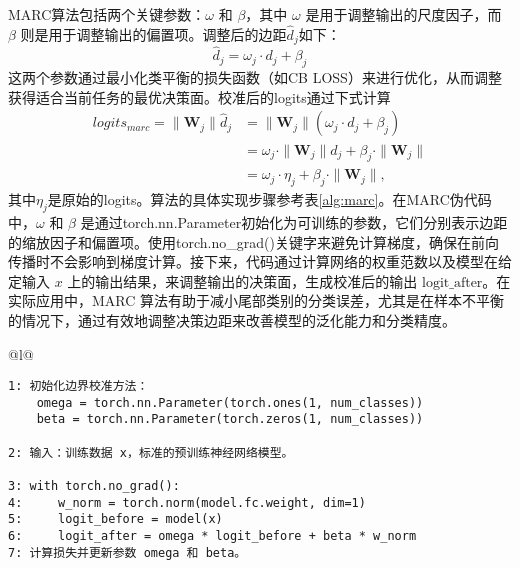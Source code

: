 \documentclass[master]{thesis-uestc}
\begin{document}
MARC算法包括两个关键参数：$\omega$ 和 $\beta$，其中 $\omega$ 是用于调整输出的尺度因子，而 $\beta$ 则是用于调整输出的偏置项。调整后的边距$\hat{d}_j$如下：
\begin{equation}
    \hat{d}_j = \omega_j \cdot d_j + \beta_j
\end{equation}
这两个参数通过最小化类平衡的损失函数（如CB LOSS）来进行优化，从而调整获得适合当前任务的最优决策面。校准后的logits通过下式计算
\begin{equation}
    \begin{split}
    logits_{marc} = \| \mathbf{W}_j \| \hat{d}_j &= \| \mathbf{W}_j \| (\omega_j \cdot d_j + \beta_j) \\
    &= \omega_j \cdot \| \mathbf{W}_j \| d_j + \beta_j \cdot \| \mathbf{W}_j \| \\
    &= \omega_j \cdot \eta_j + \beta_j \cdot \| \mathbf{W}_j \|,
    \end{split}
\end{equation}
其中$\eta_j$是原始的logits。算法的具体实现步骤参考表\ref{alg:marc}。在MARC伪代码中，$\omega$ 和 $\beta$ 是通过torch.nn.Parameter初始化为可训练的参数，它们分别表示边距的缩放因子和偏置项。使用torch.no\_grad()关键字来避免计算梯度，确保在前向传播时不会影响到梯度计算。接下来，代码通过计算网络的权重范数以及模型在给定输入 $x$ 上的输出结果，来调整输出的决策面，生成校准后的输出 $\text{logit\_after}$。在实际应用中，MARC 算法有助于减小尾部类别的分类误差，尤其是在样本不平衡的情况下，通过有效地调整决策边距来改善模型的泛化能力和分类精度。

\begin{table}[h]
    \centering
    \begin{tabular}{@{}l@{}} %
    \toprule
     \\ %
    \midrule
    \begin{lstlisting}[basicstyle=\ttfamily,frame=none]
1: 初始化边界校准方法：
    omega = torch.nn.Parameter(torch.ones(1, num_classes))
    beta = torch.nn.Parameter(torch.zeros(1, num_classes))

2: 输入：训练数据 x，标准的预训练神经网络模型。

3: with torch.no_grad():
4:     w_norm = torch.norm(model.fc.weight, dim=1)
5:     logit_before = model(x)
6:     logit_after = omega * logit_before + beta * w_norm
7: 计算损失并更新参数 omega 和 beta。
    \end{lstlisting} \\
    \hline
    \end{tabular}
    \caption{MARC 算法的实现伪代码}
    \label{alg:marc}
\end{table}
\end{document}

